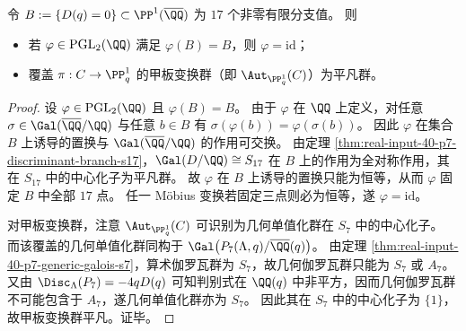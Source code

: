 \begin{theorem}[基底对称的消失与甲板变换群平凡]\label{thm:real-input-40-p7-branch-set-no-base-symmetry-deck-trivial}
令 \(B:=\{D(q)=0\}\subset\PP^1(\overline{\QQ})\) 为 \(17\) 个非零有限分支值。
则
\begin{itemize}
  \item 若 \(\varphi\in\mathrm{PGL}_2(\QQ)\) 满足 \(\varphi(B)=B\)，则 \(\varphi=\mathrm{id}\)；
  \item 覆盖 \(\pi:C\to\PP^1_q\) 的甲板变换群（即 \(\Aut_{\PP^1_q}(C)\)）为平凡群。
\end{itemize}
\end{theorem}
\begin{proof}
设 \(\varphi\in\mathrm{PGL}_2(\QQ)\) 且 \(\varphi(B)=B\)。
由于 \(\varphi\) 在 \(\QQ\) 上定义，对任意 \(\sigma\in\Gal(\overline{\QQ}/\QQ)\) 与任意 \(b\in B\) 有
\(
\sigma(\varphi(b))=\varphi(\sigma(b))
\)。
因此 \(\varphi\) 在集合 \(B\) 上诱导的置换与 \(\Gal(\overline{\QQ}/\QQ)\) 的作用可交换。
由定理 \ref{thm:real-input-40-p7-discriminant-branch-s17}，\(\Gal(D/\QQ)\cong S_{17}\) 在 \(B\) 上的作用为全对称作用，其在 \(S_{17}\) 中的中心化子为平凡群。
故 \(\varphi\) 在 \(B\) 上诱导的置换只能为恒等，从而 \(\varphi\) 固定 \(B\) 中全部 \(17\) 点。
任一 Möbius 变换若固定三点则必为恒等，遂 \(\varphi=\mathrm{id}\)。
\par
对甲板变换群，注意 \(\Aut_{\PP^1_q}(C)\) 可识别为几何单值化群在 \(S_7\) 中的中心化子。
而该覆盖的几何单值化群同构于
\(
\Gal\bigl(P_7(\Lambda,q)/\overline{\QQ}(q)\bigr)
\)。
由定理 \ref{thm:real-input-40-p7-generic-galois-s7}，算术伽罗瓦群为 \(S_7\)，故几何伽罗瓦群只能为 \(S_7\) 或 \(A_7\)。
又由 \(\Disc_{\Lambda}(P_7)=-4qD(q)\) 可知判别式在 \(\QQ(q)\) 中非平方，因而几何伽罗瓦群不可能包含于 \(A_7\)，遂几何单值化群亦为 \(S_7\)。
因此其在 \(S_7\) 中的中心化子为 \(\{1\}\)，故甲板变换群平凡。证毕。
\end{proof}
